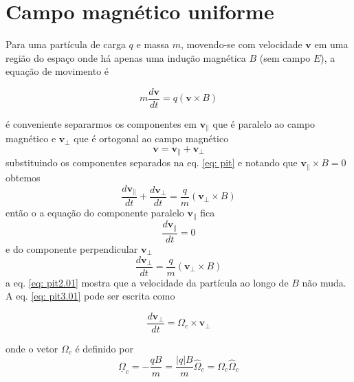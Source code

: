 \documentclass[12pt,oneside,a4paper]{abntex2}
\begin{document}
\section{Campo magnético uniforme}
\noindent Para uma partícula de carga $q$ e massa $m$, movendo-se com velocidade $\bm{v}$ em uma região do espaço onde há apenas uma indução magnética $B$ (sem campo $E$), a equação de movimento é

\begin{equation}  
\label{eq: pit}  
m\frac{d\bm{v}}{dt}= q(\bm{v} \times B)
\end{equation}

é conveniente separarmos os componentes em $\bm{v}_{\|}$ que é paralelo ao campo magnético e $\bm{v}_{\bot}$ que é ortogonal ao campo magnético 
\begin{equation}
\bm{v}=\bm{v}_{\|}+\bm{v}_{\bot}
\end{equation}
substituindo os componentes separados na eq. \ref{eq: pit} e notando que $\bm{v}_{\|} \times B = 0$ obtemos
\begin{equation}
\frac{d\bm{v}_{\|}}{dt}+\frac{d\bm{v}_{\bot}}{dt}=\frac{q}{m}(\bm{v}_{\bot} \times B)
\end{equation}
então o a equação do componente paralelo $\bm{v}_{\|}$ fica
\begin{equation}
\label{eq: pit2.01}
\frac{d\bm{v}_{\|}}{dt}=0
\end{equation} 
e do componente perpendicular $\bm{v}_{\bot}$
\begin{equation}
\label{eq: pit3}
\frac{d\bm{v}_{\bot}}{dt}=\frac{q}{m}(\bm{v}_{\bot} \times B)
\end{equation}
a eq. \ref{eq: pit2.01} mostra que a velocidade da partícula ao longo de $B$ não muda.
A eq. \ref{eq: pit3.01}  pode ser escrita como

\begin{equation}
\label{eq: pit4.02}
\frac{d\bm{v}_{\bot}}{dt}=\Omega_c  \times \bm{v}_{\bot}
\end{equation}

onde o vetor $\Omega_c$ é definido por
\begin{equation}
\underline{\Omega}_c = -\frac{qB}{m}=\frac{|q|B}{m}\hat{\Omega}_c = \Omega_c \hat{\Omega}_c
\end{equation}
\end{document}
